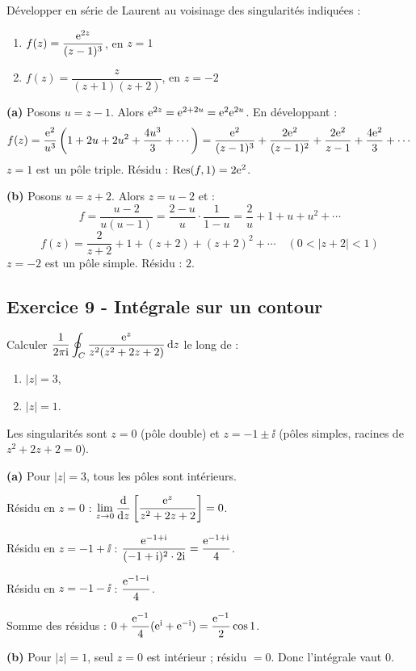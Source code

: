 \documentclass[12pt,a4paper]{article}
\begin{document}
\begin{boiteexercice}
Développer en série de Laurent au voisinage des singularités indiquées :
\begin{enumerate}[label=(\alph*)]
  \item $f(z) = \dfrac{\mathrm{e}^{2z}}{(z-1)^3}$, en $z=1$
  \item $f(z) = \dfrac{z}{(z+1)(z+2)}$, en $z=-2$
\end{enumerate}
\end{boiteexercice}

\begin{boitecorrige}
\textbf{(a)} Posons $u=z-1$. Alors $\mathrm{e}^{2z} = \mathrm{e}^{2+2u} = \mathrm{e}^2\mathrm{e}^{2u}$. En développant :
\[
f(z) = \frac{\mathrm{e}^2}{u^3}\left(1+2u+2u^2+\frac{4u^3}{3}+\cdots\right) = \frac{\mathrm{e}^2}{(z-1)^3}+\frac{2\mathrm{e}^2}{(z-1)^2}+\frac{2\mathrm{e}^2}{z-1}+\frac{4\mathrm{e}^2}{3}+\cdots
\]
$z=1$ est un pôle triple. Résidu : $\operatorname{Res}(f,1) = 2\mathrm{e}^2$.

\textbf{(b)} Posons $u=z+2$. Alors $z=u-2$ et :
\[
f = \frac{u-2}{u(u-1)} = \frac{2-u}{u}\cdot\frac{1}{1-u} = \frac{2}{u}+1+u+u^2+\cdots
\]
\[
f(z) = \frac{2}{z+2} + 1 + (z+2) + (z+2)^2 + \cdots \quad (0<|z+2|<1)
\]
$z=-2$ est un pôle simple. Résidu : $2$.
\end{boitecorrige}

\subsection*{Exercice 9 - Intégrale sur un contour \niveau{\difficile}}

\begin{boiteexercice}
Calculer $\dfrac{1}{2\pi\mathrm{i}}\displaystyle\oint_C \frac{\mathrm{e}^z}{z^2(z^2+2z+2)}\,\mathrm{d} z$ le long de :
\begin{enumerate}[label=(\alph*)]
  \item $|z|=3$,
  \item $|z|=1$.
\end{enumerate}
\end{boiteexercice}

\begin{boitecorrige}
Les singularités sont $z=0$ (pôle double) et $z=-1\pm\ii$ (pôles simples, racines de $z^2+2z+2=0$).

\textbf{(a)} Pour $|z|=3$, tous les pôles sont intérieurs.

Résidu en $z=0$ : $\displaystyle\lim_{z\to0}\frac{\mathrm{d}}{\mathrm{d} z}\left[\frac{\mathrm{e}^z}{z^2+2z+2}\right] = 0$.

Résidu en $z=-1+\ii$ : $\dfrac{\mathrm{e}^{-1+\mathrm{i}}}{(-1+\mathrm{i})^2\cdot 2\mathrm{i}} = \dfrac{\mathrm{e}^{-1+\mathrm{i}}}{4}$.

Résidu en $z=-1-\ii$ : $\dfrac{\mathrm{e}^{-1-\mathrm{i}}}{4}$.

Somme des résidus : $0 + \dfrac{\mathrm{e}^{-1}}{4}(\mathrm{e}^{\mathrm{i}}+\mathrm{e}^{-\mathrm{i}}) = \dfrac{\mathrm{e}^{-1}}{2}\cos 1$.

\textbf{(b)} Pour $|z|=1$, seul $z=0$ est intérieur ; résidu $=0$. Donc l'intégrale vaut $0$.
\end{boitecorrige}
\end{document}
